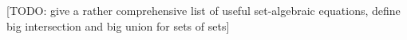 [TODO: give a rather comprehensive list of useful set-algebraic equations, define big intersection and big union for sets of sets]









